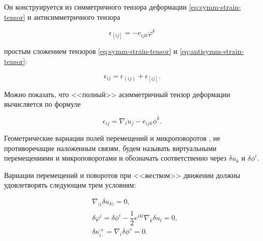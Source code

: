 Он конструируется из симметричного тензора деформации \eqref{eq:symm-strain-tensor} и антисимметричного тензора

\begin{equation}

\epsilon_{[ij]}=-e_{ijk}\varphi^k

\label{eq:antisymm-strain-tensor}

\end{equation}

простым сложением тензоров \eqref{eq:symm-strain-tensor} и \eqref{eq:antisymm-strain-tensor}:

\begin{equation}

\epsilon_{ij}=\epsilon_{(ij)}+\epsilon_{[ij]}.

\end{equation}

Можно показать, что <<полный>> асимметричный тензор деформации вычисляется по формуле

\begin{equation}

\epsilon_{ij}=\nabla_iu_j-e_{ijk}\phi^k.

\label{eq:asymm-strain-tensor}

\end{equation}





\smallskip





%

Геометрические вариации полей перемещений и микроповоротов \cite{Gunther-1941, Gelfand-Fomin-1961, Kovalev-Radayev-2009}, не противоречащие наложенным связям, будем называть виртуальными перемещениями и микроповоротами и обозначать соответственно через \(\delta u_k\) и \(\delta\phi^i\). 



Вариации перемещений и поворотов при <<жестком>>  движении должны удовлетворять следующим трем условиям:

\begin{align}

&\nabla_{(i}\delta u_{k)}=0,\label{eq:v-rigid-motion-1}\\

&\delta\varphi^i=\delta\phi^i-\dfrac{1}{2}e^{ikl}\nabla_k\delta u_l=0,\label{eq:v-rigid-motion-2}\\

&\delta\kappa_{i\cdot}^{\cdot s}=\nabla_i\delta\phi^s=0.\label{eq:v-rigid-motion-3}

\end{align}


